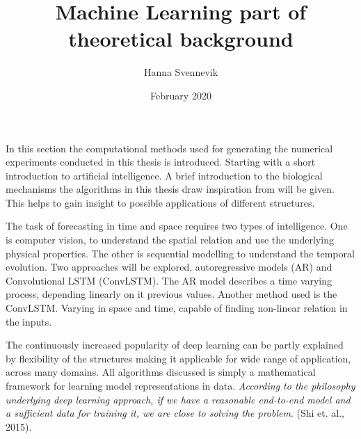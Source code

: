 \documentclass{article}
\title{Machine Learning part of theoretical background}
\author{Hanna Svennevik}
\date{February 2020}
\begin{document}
\maketitle
%
In this section the computational methods used for generating the numerical experiments conducted in this thesis is introduced. Starting with a short introduction to artificial intelligence. A brief introduction to the biological mechanisms the algorithms in this thesis draw inspiration from will be given. 
This helps to gain insight to possible applications of different structures. 

The task of forecasting in time and space requires two types of intelligence. One is computer vision, to understand the spatial relation and use the underlying physical properties. The other is sequential modelling to understand the temporal evolution. Two approaches will be explored, autoregressive models (AR) and Convolutional LSTM (ConvLSTM). The AR model describes a time varying process, depending linearly on it previous values. Another method used is the ConvLSTM. Varying in space and time, capable of finding non-linear relation in the inputs.

The continuously increased popularity of deep learning can be partly explained by flexibility of the structures making it applicable for wide range of application, across many domains. All algorithms discussed is simply a mathematical framework for learning model representations in data. \textit{According to the philosophy underlying deep learning approach, if we have a reasonable end-to-end model and a sufficient data for training it, we are close to solving the problem}. (Shi et. al., 2015). 

\end{document}

